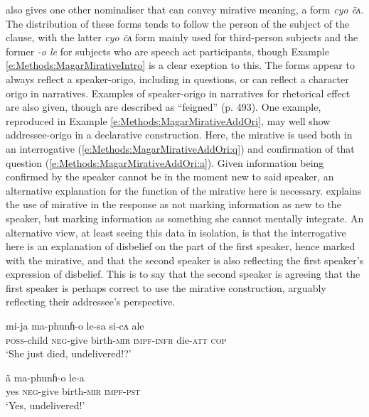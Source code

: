  also gives one other nominaliser that can convey mirative meaning, a form \textit{cyo \~ cʌ}. The distribution of these forms tends to follow the person of the subject of the clause, with the latter \textit{cyo \~ cʌ} form mainly used for third-person subjects and the former \textit{-o le} for subjects who are speech act participants, though Example \ref{e:Methods:MagarMirativeIntro} is a clear exeption to this. The forms appear to always reflect a speaker-origo, including in questions, or can reflect a character origo in narratives. Examples of speaker-origo in narratives for rhetorical effect are also given, though are described as ``feigned'' (p. 493). One example, reproduced in Example \ref{e:Methods:MagarMirativeAddOri}, may well show addressee-origo in a declarative construction. Here, the mirative is used both in an interrogative (\ref{e:Methods:MagarMirativeAddOri:q}) and confirmation of that question (\ref{e:Methods:MagarMirativeAddOri:a}). Given information being confirmed by the speaker cannot be in the moment new to said speaker, an alternative explanation for the function of the mirative here is necessary.  explains the use of mirative in the response as not marking information as new to the speaker, but marking information as something she cannot mentally integrate. An alternative view, at least seeing this data in isolation, is that the interrogative here is an explanation of disbelief on the part of the first speaker, hence marked with the mirative, and that the second speaker is also reflecting the first speaker's expression of disbelief. This is to say that the second speaker is agreeing that the first speaker is perhaps correct to use the mirative construction, arguably reflecting their addressee's perspective.

\begin{exe}
  \ex \label{e:Methods:MagarMirativeAddOri}
  \begin{xlist}
    \ex \label{e:Methods:MagarMirativeAddOri:q}
    \gll mi-ja ma-phunɦ-o le-sa si-cʌ ale \\
    \textsc{poss}-child \textsc{neg}-{give birth}-\textsc{mir} \textsc{impf-infr} die-\textsc{att} \textsc{cop} \\
    \glt `She just died, undelivered!?'

    \ex \label{e:Methods:MagarMirativeAddOri:a}
    \gll ã ma-phunɦ-o le-a \\
    yes \textsc{neg}-{give birth}-\textsc{mir} \textsc{impf-pst} \\
    \glt `Yes, undelivered!'
  \end{xlist}
  \cite[Magar,][487]{GrunowHarsta2008}
\end{exe}

